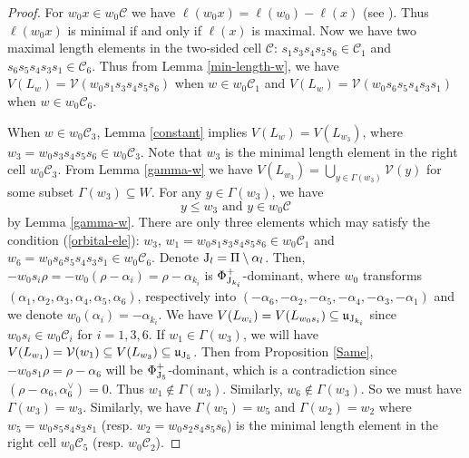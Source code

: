 \documentclass[11pt, reqno]{amsart}
\renewcommand{\subset}{\subseteq}
\theoremstyle{definition}
\numberwithin{equation}{section}
\begin{document}
\begin{proof}
    For $w_0x\in w_0\mathcal{C}$ we have $\ell(w_0x)=\ell(w_0)-\ell(x)$ (see \cite[Cor. 2.3.3]{BB05}). Thus  $\ell(w_0x)$ is minimal if and only if  $\ell(x)$ is maximal. Now we have two maximal length elements in the two-sided cell $\mathcal{C}$: $s_1s_3s_4s_5s_6\in \mathcal{C}_1$ and $s_6s_5s_4s_3s_1\in \mathcal{C}_6$. Thus from  Lemma \ref{min-length-w}, we have $V(L_w)=\mathcal V(w_0s_1s_3s_4s_5s_6)$ when $w\in w_0\mathcal{C}_1$ and $V(L_w)=\mathcal V(w_0s_6s_5s_4s_3s_1)$ when $w\in w_0\mathcal{C}_6$.


When $w \in w_0\mathcal{C}_3$, Lemma \ref{constant} implies $V(L_w) = V(L_{w_3})$, where  $w_3=w_0s_3s_4s_5s_6 \in w_0\mathcal{C}_3$. Note that $w_3$ is the minimal length element in  the right cell $w_0\mathcal{C}_3$. From Lemma \ref{gamma-w} we have $V(L_{w_3})=\bigcup\limits_{y\in \Gamma(w_3)}\mathcal{V}(y)$ for some subset $\Gamma(w_3)\subset W$. For any $y\in \Gamma(w_3)$, we  have \begin{equation}\label{orbital-ele}
    y\leq w_3 \text{~and~} y\in w_0\mathcal{C}
\end{equation} by Lemma \ref{gamma-w}. There are only three elements which may satisfy the condition (\ref{orbital-ele}): $w_3$, $w_1=w_0s_1s_3s_4s_5s_6\in w_0\mathcal{C}_1$
 and $w_6=w_0s_6s_5s_4s_3s_1\in w_0\mathcal{C}_6$. 
 Denote ${\rm J}_l=\Pi\setminus {\alpha_l}$. 
Then,  $-w_0s_i\rho=-w_0(\rho-\alpha_i)=\rho-\alpha_{k_i}$ is $\Phi_{{\rm J}_{k_i}}^+$-dominant, where
 $w_0$ transforms $(\alpha_1,\alpha_2,\alpha_3,\alpha_4,\alpha_5,\alpha_6)$, respectively into $(-\alpha_6,-\alpha_2,-\alpha_5,-\alpha_4,-\alpha_3,-\alpha_1)$ and we denote $w_0(\alpha_i)=-\alpha_{k_i}$.
We  have $V(L_{w_i})=V(L_{w_0s_i})\subset \mathfrak{u}_{{\rm J}_{k_i}}$ since $w_0s_i\in w_0\mathcal{C}_i$ for $i=1,3,6$. If $w_1\in \Gamma(w_3)$,  we will have $V(L_{w_1})=\mathcal{V}(w_1)\subset V(L_{w_3})\subset \mathfrak{u}_{{\rm J}_5}$. Then from Proposition \ref{Same}, $-w_0s_1\rho=\rho-\alpha_6$ will be  $\Phi_{{\rm J}_5}^+$-dominant, which is a contradiction since $(\rho-\alpha_6,\alpha^{\vee}_6)=0$. Thus $w_1\notin \Gamma(w_3)$. Similarly, $w_6\notin \Gamma(w_3)$. So we must have $\Gamma(w_3)=w_3$. Similarly, we have $\Gamma(w_5)=w_5$ and $\Gamma(w_2)=w_2$ where $w_5=w_0s_5s_4s_3s_1$ (resp. $w_2=w_0s_2s_4s_5s_6$) is the minimal length element in the right cell $w_0\mathcal{C}_5$ (resp. $w_0\mathcal{C}_2$).


\end{proof}
\end{document}
